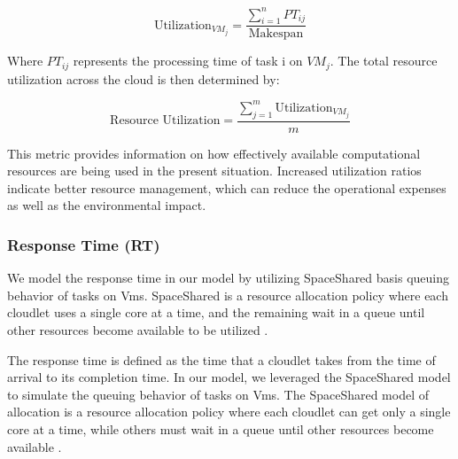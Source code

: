 \documentclass[pdflatex,sn-mathphys-num]{sn-jnl}%
\theoremstyle{thmstyleone}%
\theoremstyle{thmstyletwo}%
\theoremstyle{thmstylethree}%
\begin{document}
\begin{equation} \label{eq4}
\text{Utilization}_{VM_j} = \frac{\sum_{i=1}^{n} PT_{ij}}{\text{Makespan}}
\end{equation}

Where \( PT_{ij} \) represents the processing time of task i on \( VM_j \). The total resource utilization across the cloud is then determined by:

\begin{equation} \label{eq5}
\text{Resource Utilization} = \frac{\sum_{j=1}^{m} \text{Utilization}_{VM_j}}{m}
\end{equation}

This metric provides information on how effectively available computational resources are being used in the present situation. Increased utilization ratios indicate better resource management, which can reduce the operational expenses as well as the environmental impact.





\subsubsection{Response Time (RT)}\label{subsubsec3.2.3}

 We model the response time in our model by utilizing SpaceShared basis queuing behavior of tasks on Vms. SpaceShared is a resource allocation policy where each cloudlet uses a single core at a time, and the remaining wait in a queue until other resources become available to be utilized \cite{space-shared}.

The response time is defined as the time that a cloudlet takes from the time of arrival to its completion time. In our model, we leveraged the SpaceShared model to simulate the queuing behavior of tasks on Vms. The SpaceShared model of allocation is a resource allocation policy where each cloudlet can get only a single core at a time, while others must wait in a queue until other resources become available \cite{space-shared}.
\end{document}
